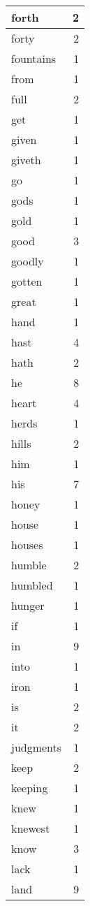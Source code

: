 \begin{center}
\begin{longtable}{l|r}
forth & 2 \\ \hline
forty & 2 \\ \hline
fountains & 1 \\ \hline
from & 1 \\ \hline
full & 2 \\ \hline
get & 1 \\ \hline
given & 1 \\ \hline
giveth & 1 \\ \hline
go & 1 \\ \hline
gods & 1 \\ \hline
gold & 1 \\ \hline
good & 3 \\ \hline
goodly & 1 \\ \hline
gotten & 1 \\ \hline
great & 1 \\ \hline
hand & 1 \\ \hline
hast & 4 \\ \hline
hath & 2 \\ \hline
he & 8 \\ \hline
heart & 4 \\ \hline
herds & 1 \\ \hline
hills & 2 \\ \hline
him & 1 \\ \hline
his & 7 \\ \hline
honey & 1 \\ \hline
house & 1 \\ \hline
houses & 1 \\ \hline
humble & 2 \\ \hline
humbled & 1 \\ \hline
hunger & 1 \\ \hline
if & 1 \\ \hline
in & 9 \\ \hline
into & 1 \\ \hline
iron & 1 \\ \hline
is & 2 \\ \hline
it & 2 \\ \hline
judgments & 1 \\ \hline
keep & 2 \\ \hline
keeping & 1 \\ \hline
knew & 1 \\ \hline
knewest & 1 \\ \hline
know & 3 \\ \hline
lack & 1 \\ \hline
land & 9 \\ \hline

\end{longtable}
\end{center}
